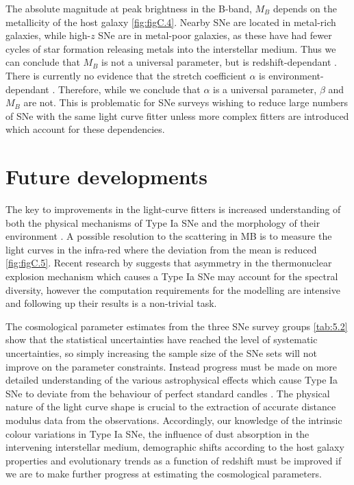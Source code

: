 The absolute magnitude at peak brightness in the B-band, $M_B$ depends on the metallicity of the host galaxy \cref{fig:figC.4}. Nearby SNe are located in metal-rich galaxies, while high-$z$ SNe are in metal-poor galaxies, as these have had fewer cycles of star formation releasing metals into the interstellar medium. Thus we can conclude that $M_B$ is not a universal parameter, but is redshift-dependant \cite{Lidman2010b}. 
There is currently no evidence that the stretch coefficient $\alpha$ is environment-dependant \cite{Linder2009}. 
Therefore, while we conclude that $\alpha$ is a universal parameter, $\beta$ and $M_B$ are not. This is problematic for SNe surveys wishing to reduce large numbers of SNe with the same light curve fitter unless more complex fitters are introduced which account for these dependencies.

\section{Future developments}
\label{sec:C.5}

The key to improvements in the light-curve fitters is increased understanding of both the physical mechanisms of Type Ia SNe and the morphology of their environment \cite{Leibundgut2008}. A possible resolution to the scattering in MB is to measure the light curves in the infra-red \cite{Leibundgut2008} where the deviation from the mean is reduced \cref{fig:figC.5}. Recent research by \cite{Maeda2010} suggests that asymmetry in the thermonuclear explosion mechanism which causes a Type Ia SNe may account for the spectral diversity, however the computation requirements for the modelling are intensive and following up their results is a non-trivial task. 

The cosmological parameter estimates from the three SNe survey groups \cref{tab:5.2} show that the statistical uncertainties have reached the level of systematic uncertainties, so simply increasing the sample size of the SNe sets will not improve on the parameter constraints. Instead progress must be made on more detailed understanding of the various astrophysical effects which cause Type Ia SNe to deviate from the behaviour of perfect standard candles \cite{Leibundgut2008}. 
The physical nature of the light curve shape is crucial to the extraction of accurate distance modulus data from the observations. Accordingly, our knowledge of the intrinsic colour variations in Type Ia SNe, the influence of dust absorption in the intervening interstellar medium, demographic shifts according to the host galaxy properties and evolutionary trends as a function of redshift must be improved if we are to make further progress at estimating the cosmological parameters.
